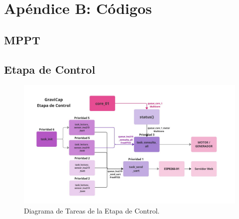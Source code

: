 \chapter{Apéndice B: Códigos}
\renewcommand{\thepage}{B-\arabic{page}}
\setcounter{page}{1}
    \section{MPPT}
    
        
        \label{Listing B.1}
        
    \section{Etapa de Control}
        
        \label{Listing B.2}
        
        
        \label{Listing B.3}

        
        \label{Listing B.4}

        
        \label{Listing B.5}

        
        \label{Listing B.6}

        
        \label{Listing B.7}

        
        \label{Listing B.8}

        
        \label{Listing B.9}

        
        \label{Listing B.10}
        
        \begin{figure} [H]
            \centering
            \includegraphics[width=\linewidth]{Imagenes/Anexo_B/Tareas.pdf}
            \caption{Diagrama de Tareas de la Etapa de Control.}
            \label{fig:B1}
        \end{figure}